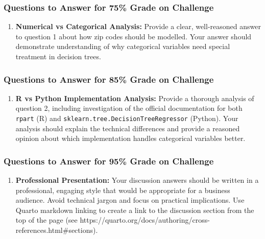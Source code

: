 \documentclass[
  letterpaper,
  DIV=11,
  numbers=noendperiod]{scrartcl}
\providecommand{\tightlist}{%
  \setlength{\itemsep}{0pt}\setlength{\parskip}{0pt}}
\begin{document}
\subsubsection{Questions to Answer for 75\% Grade on
Challenge}\label{questions-to-answer-for-75-grade-on-challenge}

\begin{enumerate}
\def\labelenumi{\arabic{enumi}.}
\tightlist
\item
  \textbf{Numerical vs Categorical Analysis:} Provide a clear,
  well-reasoned answer to question 1 about how zip codes should be
  modelled. Your answer should demonstrate understanding of why
  categorical variables need special treatment in decision trees.
\end{enumerate}

\subsubsection{Questions to Answer for 85\% Grade on
Challenge}\label{questions-to-answer-for-85-grade-on-challenge}

\begin{enumerate}
\def\labelenumi{\arabic{enumi}.}
\setcounter{enumi}{1}
\tightlist
\item
  \textbf{R vs Python Implementation Analysis:} Provide a thorough
  analysis of question 2, including investigation of the official
  documentation for both \texttt{rpart} (R) and
  \texttt{sklearn.tree.DecisionTreeRegressor} (Python). Your analysis
  should explain the technical differences and provide a reasoned
  opinion about which implementation handles categorical variables
  better.
\end{enumerate}

\subsubsection{Questions to Answer for 95\% Grade on
Challenge}\label{questions-to-answer-for-95-grade-on-challenge}

\begin{enumerate}
\def\labelenumi{\arabic{enumi}.}
\setcounter{enumi}{2}
\tightlist
\item
  \textbf{Professional Presentation:} Your discussion answers should be
  written in a professional, engaging style that would be appropriate
  for a business audience. Avoid technical jargon and focus on practical
  implications. Use Quarto markdown linking to create a link to the
  discussion section from the top of the page (see
  https://quarto.org/docs/authoring/cross-references.html\#sections).
\end{enumerate}
\end{document}
